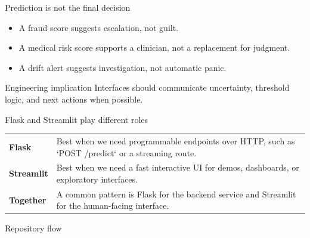 \begin{frame}{Prediction is not the final decision}
\begin{itemize}
\item A fraud score suggests escalation, not guilt.
\item A medical risk score supports a clinician, not a replacement for judgment.
\item A drift alert suggests investigation, not automatic panic.
\end{itemize}
\begin{block}{Engineering implication}
Interfaces should communicate uncertainty, threshold logic, and next actions when possible.
\end{block}
\coursefooter
\end{frame}

\begin{frame}{Flask and Streamlit play different roles}
\begin{tabularx}{\textwidth}{>{\bfseries}l X}
Flask & Best when we need programmable endpoints over HTTP, such as `POST /predict` or a streaming route. \\
Streamlit & Best when we need a fast interactive UI for demos, dashboards, or exploratory interfaces. \\
Together & A common pattern is Flask for the backend service and Streamlit for the human-facing interface. \\
\end{tabularx}
\coursefooter
\end{frame}

\begin{frame}{Repository flow}
\centering
{}
\coursefooter
\end{frame}

